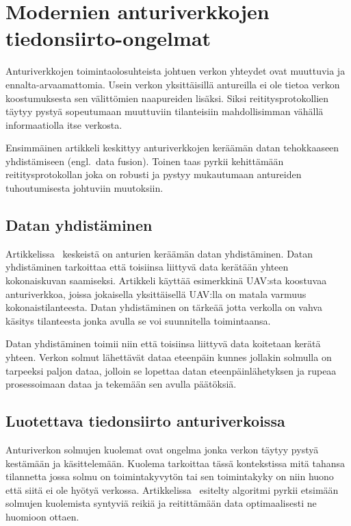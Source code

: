 \section{Modernien anturiverkkojen tiedonsiirto-ongelmat}
\label{sec:problem}

Anturiverkkojen toimintaolosuhteista johtuen verkon yhteydet ovat muuttuvia ja
ennalta-arvaamattomia. Usein verkon yksittäisillä antureilla ei ole tietoa
verkon koostumuksesta sen välittömien naapureiden lisäksi. Siksi
reititysprotokollien täytyy pystyä sopeutumaan muuttuviin tilanteisiin
mahdollisimman vähällä informaatiolla itse verkosta.

Ensimmäinen artikkeli keskittyy anturiverkkojen keräämän datan tehokkaaseen
yhdistämiseen (engl.\ data fusion). Toinen taas pyrkii kehittämään
reititysprotokollan joka on robusti ja pystyy mukautumaan antureiden
tuhoutumisesta johtuviin muutoksiin.

\subsection{Datan yhdistäminen}
Artikkelissa~\cite{Yu2006} keskeistä on anturien keräämän datan yhdistäminen.
Datan yhdistäminen tarkoittaa että toisiinsa liittyvä data kerätään yhteen
kokonaiskuvan saamiseksi. Artikkeli
käyttää esimerkkinä UAV:sta koostuvaa anturiverkkoa, joissa jokaisella
yksittäisellä UAV:lla on matala varmuus kokonaistilanteesta. Datan yhdistäminen on
tärkeää jotta verkolla on vahva käsitys tilanteesta jonka avulla se voi
suunnitella toimintaansa.

Datan yhdistäminen toimii niin että toisiinsa liittyvä data koitetaan kerätä yhteen.
Verkon solmut lähettävät dataa eteenpäin kunnes jollakin solmulla on tarpeeksi
paljon dataa, jolloin se lopettaa datan eteenpäinlähetyksen ja rupeaa
prosessoimaan dataa ja tekemään sen avulla päätöksiä.

\subsection{Luotettava tiedonsiirto anturiverkoissa}
Anturiverkon solmujen kuolemat ovat ongelma jonka verkon täytyy pystyä
kestämään ja käsittelemään. Kuolema tarkoittaa tässä kontekstissa mitä tahansa
tilannetta jossa solmu on toimintakyvytön tai sen toimintakyky on niin huono
että siitä ei ole hyötyä verkossa. Artikkelissa~\cite{Arya2015} esitelty
algoritmi pyrkii etsimään solmujen kuolemista syntyviä reikiä ja
reitittämään data optimaalisesti ne huomioon ottaen.

